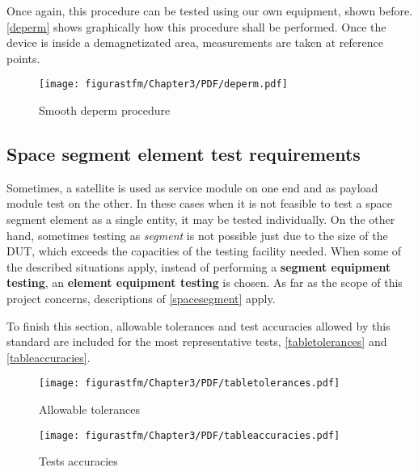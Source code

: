 Once again, this procedure can be tested using our own equipment, shown before. \autoref{deperm} shows graphically how this procedure shall be performed. Once the device is inside a demagnetizated area, measurements are taken at reference points.

	\begin{figure}[H]
			\centering
			\texttt{[image: figurastfm/Chapter3/PDF/deperm.pdf]}
			\caption{Smooth deperm procedure \cite{ESAmagnetic}}
			\label{deperm}
		\end{figure}




\subsection{Space segment element test requirements}

Sometimes, a satellite is used as service module on one end and as payload module test on the other. In these cases when it is not feasible to test a space segment element as a single entity, it may be tested individually. On the other hand, sometimes testing as \textit{segment} is not possible just due to the size of the \acrshort{DUT}, which exceeds the capacities of the testing facility needed. When some of the described situations apply, instead of performing a \textbf{segment equipment testing}, an \textbf{element equipment testing} is chosen. As far as the scope of this project concerns, descriptions of \autoref{spacesegment} apply. %

To finish this section, allowable tolerances and test accuracies allowed by this standard are included for the most representative tests, \autoref{tabletolerances} and \autoref{tableaccuracies}.


	\begin{figure}[H]
			\centering
			\texttt{[image: figurastfm/Chapter3/PDF/tabletolerances.pdf]}
			\caption{Allowable tolerances \cite{ESAtest}}
			\label{tabletolerances}
		\end{figure}


\begin{figure}[H]
			\centering
			\texttt{[image: figurastfm/Chapter3/PDF/tableaccuracies.pdf]}
			\caption{Tests accuracies \cite{ESAtest}} 			\label{tableaccuracies}
			\vspace{-1cm}
		\end{figure}

